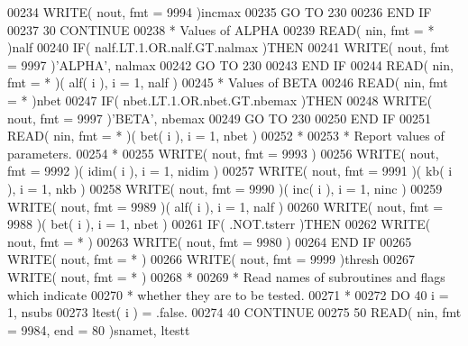 \begin{DoxyCode}
00234             \textcolor{keyword}{WRITE}( nout, fmt = 9994 )incmax
00235             \textcolor{keywordflow}{GO TO} 230
00236 \textcolor{keywordflow}{         END IF}
00237    30 \textcolor{keywordflow}{CONTINUE}
00238 \textcolor{comment}{*     Values of ALPHA}
00239       \textcolor{keyword}{READ}( nin, fmt = * )nalf
00240       \textcolor{keywordflow}{IF}( nalf.LT.1.OR.nalf.GT.nalmax )\textcolor{keywordflow}{THEN}
00241          \textcolor{keyword}{WRITE}( nout, fmt = 9997 )\textcolor{stringliteral}{'ALPHA'}, nalmax
00242          \textcolor{keywordflow}{GO TO} 230
00243 \textcolor{keywordflow}{      END IF}
00244       \textcolor{keyword}{READ}( nin, fmt = * )( alf( i ), i = 1, nalf )
00245 \textcolor{comment}{*     Values of BETA}
00246       \textcolor{keyword}{READ}( nin, fmt = * )nbet
00247       \textcolor{keywordflow}{IF}( nbet.LT.1.OR.nbet.GT.nbemax )\textcolor{keywordflow}{THEN}
00248          \textcolor{keyword}{WRITE}( nout, fmt = 9997 )\textcolor{stringliteral}{'BETA'}, nbemax
00249          \textcolor{keywordflow}{GO TO} 230
00250 \textcolor{keywordflow}{      END IF}
00251       \textcolor{keyword}{READ}( nin, fmt = * )( bet( i ), i = 1, nbet )
00252 \textcolor{comment}{*}
00253 \textcolor{comment}{*     Report values of parameters.}
00254 \textcolor{comment}{*}
00255       \textcolor{keyword}{WRITE}( nout, fmt = 9993 )
00256       \textcolor{keyword}{WRITE}( nout, fmt = 9992 )( idim( i ), i = 1, nidim )
00257       \textcolor{keyword}{WRITE}( nout, fmt = 9991 )( kb( i ), i = 1, nkb )
00258       \textcolor{keyword}{WRITE}( nout, fmt = 9990 )( inc( i ), i = 1, ninc )
00259       \textcolor{keyword}{WRITE}( nout, fmt = 9989 )( alf( i ), i = 1, nalf )
00260       \textcolor{keyword}{WRITE}( nout, fmt = 9988 )( bet( i ), i = 1, nbet )
00261       \textcolor{keywordflow}{IF}( .NOT.tsterr )\textcolor{keywordflow}{THEN}
00262          \textcolor{keyword}{WRITE}( nout, fmt = * )
00263          \textcolor{keyword}{WRITE}( nout, fmt = 9980 )
00264 \textcolor{keywordflow}{      END IF}
00265       \textcolor{keyword}{WRITE}( nout, fmt = * )
00266       \textcolor{keyword}{WRITE}( nout, fmt = 9999 )thresh
00267       \textcolor{keyword}{WRITE}( nout, fmt = * )
00268 \textcolor{comment}{*}
00269 \textcolor{comment}{*     Read names of subroutines and flags which indicate}
00270 \textcolor{comment}{*     whether they are to be tested.}
00271 \textcolor{comment}{*}
00272       \textcolor{keywordflow}{DO} 40 i = 1, nsubs
00273          ltest( i ) = .false.
00274    40 \textcolor{keywordflow}{CONTINUE}
00275    50 \textcolor{keyword}{READ}( nin, fmt = 9984, end = 80 )snamet, ltestt

\end{DoxyCode}
